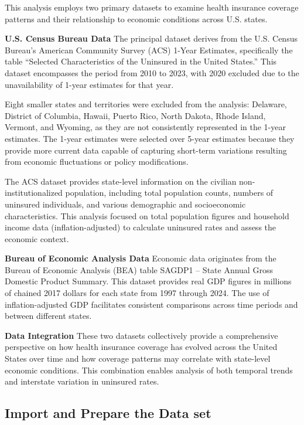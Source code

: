 \documentclass[
]{article}
\begin{document}
This analysis employs two primary datasets to examine health insurance
coverage patterns and their relationship to economic conditions across
U.S. states.

\textbf{U.S. Census Bureau Data} The principal dataset derives from the
U.S. Census Bureau's American Community Survey (ACS) 1-Year Estimates,
specifically the table ``Selected Characteristics of the Uninsured in
the United States.'' This dataset encompasses the period from 2010 to
2023, with 2020 excluded due to the unavailability of 1-year estimates
for that year.

Eight smaller states and territories were excluded from the analysis:
Delaware, District of Columbia, Hawaii, Puerto Rico, North Dakota, Rhode
Island, Vermont, and Wyoming, as they are not consistently represented
in the 1-year estimates. The 1-year estimates were selected over 5-year
estimates because they provide more current data capable of capturing
short-term variations resulting from economic fluctuations or policy
modifications.

The ACS dataset provides state-level information on the civilian
non-institutionalized population, including total population counts,
numbers of uninsured individuals, and various demographic and
socioeconomic characteristics. This analysis focused on total population
figures and household income data (inflation-adjusted) to calculate
uninsured rates and assess the economic context.

\textbf{Bureau of Economic Analysis Data} Economic data originates from
the Bureau of Economic Analysis (BEA) table SAGDP1 -- State Annual Gross
Domestic Product Summary. This dataset provides real GDP figures in
millions of chained 2017 dollars for each state from 1997 through 2024.
The use of inflation-adjusted GDP facilitates consistent comparisons
across time periods and between different states.

\textbf{Data Integration} These two datasets collectively provide a
comprehensive perspective on how health insurance coverage has evolved
across the United States over time and how coverage patterns may
correlate with state-level economic conditions. This combination enables
analysis of both temporal trends and interstate variation in uninsured
rates.

\subsection{Import and Prepare the Data
set}\label{import-and-prepare-the-data-set}
\end{document}
